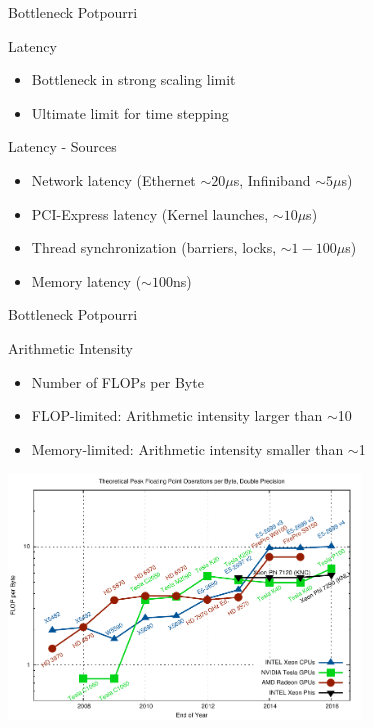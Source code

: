 

\begin{frame}[fragile]{Bottleneck Potpourri}

 \begin{block}{Latency}
  \begin{itemize}
   \item Bottleneck in strong scaling limit
   \item Ultimate limit for time stepping
  \end{itemize}
 \end{block}

 \begin{block}{Latency - Sources}
  \begin{itemize}
   \item Network latency (Ethernet $\sim 20 \mu$s, Infiniband $\sim 5 \mu$s)
   \item PCI-Express latency (Kernel launches, $\sim 10 \mu$s)
   \item Thread synchronization (barriers, locks, $\sim 1-100 \mu$s)
   \item Memory latency ($\sim 100$ns)
  \end{itemize}
 \end{block}

\end{frame}


\begin{frame}[fragile]{Bottleneck Potpourri}

 \begin{block}{Arithmetic Intensity}
  \begin{itemize}
   \item Number of FLOPs per Byte
   \item FLOP-limited: Arithmetic intensity larger than $\sim$10
   \item Memory-limited: Arithmetic intensity smaller than $\sim$1
  \end{itemize}
 \end{block}

 \vspace*{-0.5cm}
 \begin{center}
   \includegraphics[width=0.7\textwidth]{figures/flop-per-byte-dp}
 \end{center}

\end{frame}


